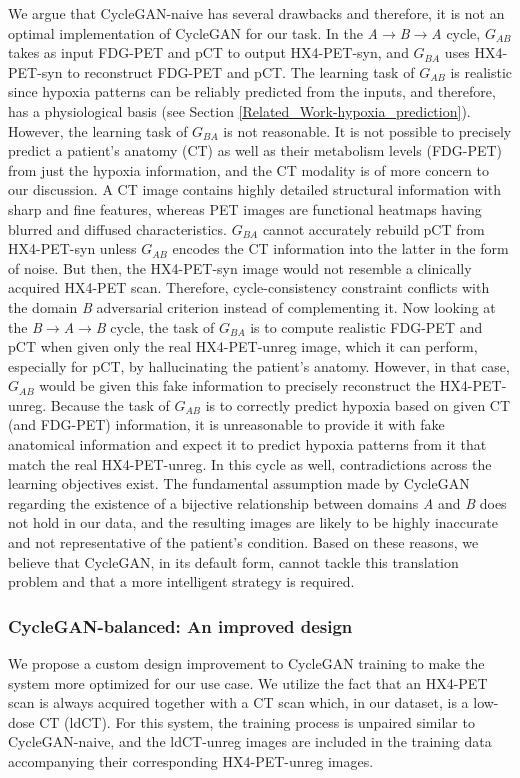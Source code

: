 We argue that CycleGAN-naive has several drawbacks and therefore, it is not an optimal implementation of CycleGAN for our task. In the \textit{A}$\rightarrow$\textit{B}$\rightarrow$\textit{A} cycle, $G_{AB}$ takes as input FDG-PET and pCT to output HX4-PET-syn, and $G_{BA}$ uses HX4-PET-syn to reconstruct FDG-PET and pCT. The learning task of $G_{AB}$ is realistic since hypoxia patterns can be reliably predicted from the inputs, and therefore, has a physiological basis (see Section \ref{Related_Work-hypoxia_prediction}). However, the learning task of $G_{BA}$ is not reasonable. It is not possible to precisely predict a patient's anatomy (CT) as well as their metabolism levels (FDG-PET) from just the hypoxia information, and the CT modality is of more concern to our discussion. A CT image contains highly detailed structural information with sharp and fine features, whereas PET images are functional heatmaps having blurred and diffused characteristics. $G_{BA}$ cannot accurately rebuild pCT from HX4-PET-syn unless $G_{AB}$ encodes the CT information into the latter in the form of noise. But then, the HX4-PET-syn image would not resemble a clinically acquired HX4-PET scan. Therefore, cycle-consistency constraint conflicts with the domain \textit{B} adversarial criterion instead of complementing it. Now looking at the \textit{B}$\rightarrow$\textit{A}$\rightarrow$\textit{B} cycle, the task of $G_{BA}$ is to compute realistic FDG-PET and pCT when given only the real HX4-PET-unreg image, which it can perform, especially for pCT, by hallucinating the patient's anatomy. However, in that case, $G_{AB}$ would be given this fake information to precisely reconstruct the HX4-PET-unreg. Because the task of $G_{AB}$ is to correctly predict hypoxia based on given CT (and FDG-PET) information, it is unreasonable to provide it with fake anatomical information and expect it to predict hypoxia patterns from it that match the real HX4-PET-unreg. In this cycle as well, contradictions across the learning objectives exist. The fundamental assumption made by CycleGAN regarding the existence of a bijective relationship between domains \textit{A} and \textit{B} does not hold in our data, and the resulting images are likely to be highly inaccurate and not representative of the patient's condition. Based on these reasons, we believe that CycleGAN, in its default form, cannot tackle this translation problem and that a more intelligent strategy is required.


\subsubsection{CycleGAN-balanced: An improved design}
We propose a custom design improvement to CycleGAN training to make the system more optimized for our use case. We utilize the fact that an HX4-PET scan is always acquired together with a CT scan which, in our dataset, is a low-dose CT (ldCT). For this system, the training process is unpaired similar to CycleGAN-naive, and the ldCT-unreg images are included in the training data accompanying their corresponding HX4-PET-unreg images. 

